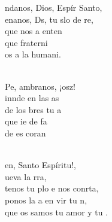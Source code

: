 \documentclass[12pt]{article}
\begin{document}
\begin{multicols*}{2}
\begin{cancion}%
	ndanos, Dios, Espír Santo,\\
	enanos, Ds, tu slo de re, \\
	que nos a enten\\
	que  fraterni\\
	os a la humani.\\\jump\\
	\begin{chorus}%
	Pe, ambranos, ¡osz! \\
	innde en las as\\
	de los bres tu a\\
	que ie de fa\\
	de es coran\\
	\end{chorus}%
	\jump\\
	en, Santo Espíritu!, \\
	ueva la rra,\\
	tenos tu plo e nos conrta, \\
	ponos la a en vir tu n,\\
	que os samos tu amor y tu .\\
\end{cancion}%


\end{multicols*}
\end{document}

